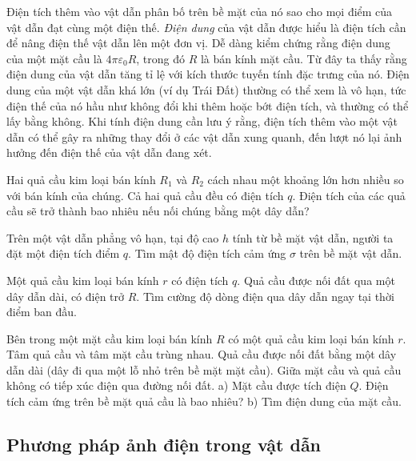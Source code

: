 Điện tích thêm vào vật dẫn phân bố trên bề mặt của nó sao cho mọi điểm của vật dẫn đạt cùng một điện thế. \emph{Điện dung} của vật dẫn được hiểu là điện tích cần để nâng điện thế vật dẫn lên một đơn vị. Dễ dàng kiểm chứng rằng điện dung của một mặt cầu là $4\pi\varepsilon_0 R$, trong đó $R$ là bán kính mặt cầu. Từ đây ta thấy rằng điện dung của vật dẫn tăng tỉ lệ với kích thước tuyến tính đặc trưng của nó. Điện dung của một vật dẫn khá lớn (ví dụ Trái Đất) thường có thể xem là vô hạn, tức điện thế của nó hầu như không đổi khi thêm hoặc bớt điện tích, và thường có thể lấy bằng không. Khi tính điện dung cần lưu ý rằng, điện tích thêm vào một vật dẫn có thể gây ra những thay đổi ở các vật dẫn xung quanh, đến lượt nó lại ảnh hưởng đến điện thế của vật dẫn đang xét.

 Hai quả cầu kim loại bán kính $R_1$ và $R_2$ cách nhau một khoảng lớn hơn nhiều so với bán kính của chúng. Cả hai quả cầu đều có điện tích $q$. Điện tích của các quả cầu sẽ trở thành bao nhiêu nếu nối chúng bằng một dây dẫn?


 Trên một vật dẫn phẳng vô hạn, tại độ cao $h$ tính từ bề mặt vật dẫn, người ta đặt một điện tích điểm $q$. Tìm mật độ điện tích cảm ứng $\sigma$ trên bề mặt vật dẫn.


 Một quả cầu kim loại bán kính $r$ có điện tích $q$. Quả cầu được nối đất qua một dây dẫn dài, có điện trở $R$. Tìm cường độ dòng điện qua dây dẫn ngay tại thời điểm ban đầu.


 Bên trong một mặt cầu kim loại bán kính $R$ có một quả cầu kim loại bán kính $r$. Tâm quả cầu và tâm mặt cầu trùng nhau. Quả cầu được nối đất bằng một dây dẫn dài (dây đi qua một lỗ nhỏ trên bề mặt mặt cầu). Giữa mặt cầu và quả cầu không có tiếp xúc điện qua đường nối đất. a) Mặt cầu được tích điện $Q$. Điện tích cảm ứng trên bề mặt quả cầu là bao nhiêu? b) Tìm điện dung của mặt cầu.


\subsection{Phương pháp ảnh điện trong vật dẫn}

